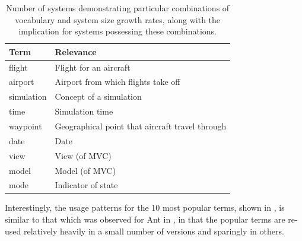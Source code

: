 \begin{table}[t]
\centering
\begin{tabular}{|p{}|l|}
\hline
{\bf Term} & {\bf Relevance} \\
\hline
\hline
flight & Flight for an aircraft \\
\hline
airport & Airport from which flights take off \\
\hline
simulation & Concept of a simulation \\
\hline
time & Simulation time \\
\hline
waypoint & Geographical point that aircraft travel through \\
\hline
date & Date \\
\hline
view & View (of MVC) \\
\hline
model & Model (of MVC) \\
\hline
mode & Indicator of state \\
\hline

% 
% 
% 
% 
% 
% 
% 
% 
% 
% 
% 

\end{tabular}
\vspace{0.2cm}
\caption{Number of systems demonstrating particular combinations of vocabulary and system size growth rates, along with the implication for systems possessing these combinations.}
\label{tab:avasa_popular_terms}
\vspace{-0.2cm}
\end{table}

Interestingly, the usage patterns for the 10 most popular terms, shown in , is similar to that which was observed for Ant in , in that the popular terms are re-used relatively heavily in a small number of versions and sparingly in others.

